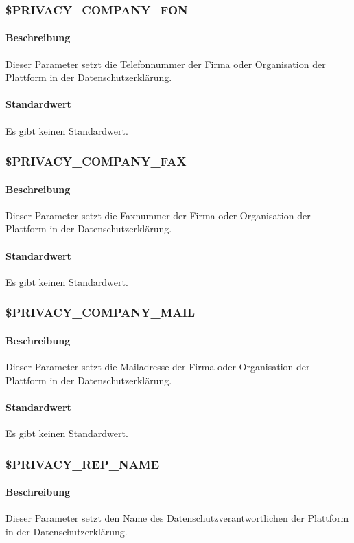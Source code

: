 \subsubsection{\$PRIVACY\_COMPANY\_FON}\label{config:privacy-comp-fon}
\paragraph{Beschreibung}Dieser Parameter setzt die Telefonnummer der Firma oder Organisation der Plattform in der Datenschutzerklärung.
\paragraph{Standardwert}Es gibt keinen Standardwert.

\subsubsection{\$PRIVACY\_COMPANY\_FAX}\label{config:privacy-comp-fax}
\paragraph{Beschreibung}Dieser Parameter setzt die Faxnummer der Firma oder Organisation der Plattform in der Datenschutzerklärung.
\paragraph{Standardwert}Es gibt keinen Standardwert.

\subsubsection{\$PRIVACY\_COMPANY\_MAIL}\label{config:privacy-comp-mail}
\paragraph{Beschreibung}Dieser Parameter setzt die Mailadresse der Firma oder Organisation der Plattform in der Datenschutzerklärung.
\paragraph{Standardwert}Es gibt keinen Standardwert.

\subsubsection{\$PRIVACY\_REP\_NAME}\label{config:privacy-rep-name}
\paragraph{Beschreibung}Dieser Parameter setzt den Name des Datenschutzverantwortlichen der Plattform in der Datenschutzerklärung.
